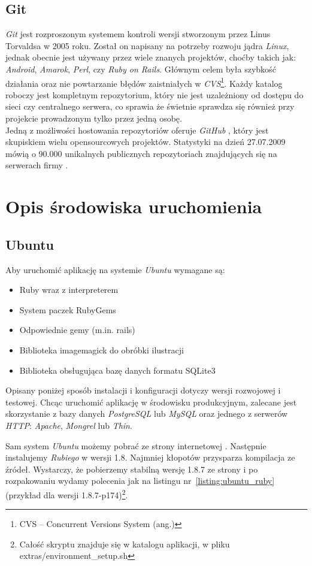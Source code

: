\documentclass[12pt,twoside]{report}
\begin{document}
\section{Git}
\emph{Git} jest rozproszonym systemem kontroli wersji stworzonym przez Linus Torvaldsa w 2005 roku.
Został on napisany na potrzeby rozwoju jądra \emph{Linux}, jednak obecnie jest używany
przez wiele znanych projektów, choćby takich jak: \emph{Android}, \emph{Amarok}, \emph{Perl},
czy \emph{Ruby on Rails}. Głównym celem była szybkość działania oraz nie powtarzanie błędów
zaistniałych w \emph{CVS}\footnote{CVS -- Concurrent Versions System (ang.)}.
Każdy katalog roboczy jest kompletnym repozytorium, który nie jest uzależniony od dostępu
do sieci czy centralnego serwera, co sprawia że świetnie sprawdza się również przy projekcie
prowadzonym tylko przez jedną osobę.\\
Jedną z możliwości hostowania repozytoriów oferuje \emph{GitHub} \cite{github}, który jest
skupiskiem wielu opensourcowych projektów. Statystyki na dzień 27.07.2009 mówią o 90.000
unikalnych publicznych repozytoriach znajdujących się na serwerach firmy \cite{github-statistics}.


\cleardoublepage
\chapter{Opis środowiska uruchomienia}
\section{Ubuntu}
Aby uruchomić aplikację na systemie \emph{Ubuntu} wymagane są:
\begin{itemize}
  \item{Ruby wraz z interpreterem}
  \item{System paczek RubyGems}
  \item{Odpowiednie gemy (m.in. rails)}
  \item{Biblioteka imagemagick do obróbki ilustracji}
  \item{Biblioteka obsługująca bazę danych formatu SQLite3}
\end{itemize}


Opisany poniżej sposób instalacji i konfiguracji dotyczy wersji rozwojowej i testowej.
Chcąc uruchomić aplikację w środowisku produkcyjnym, zalecane jest skorzystanie z bazy
danych \emph{PostgreSQL} lub \emph{MySQL} oraz jednego z serwerów \emph{HTTP}:
\emph{Apache}, \emph{Mongrel} lub \emph{Thin}.


Sam system \emph{Ubuntu} możemy pobrać ze strony internetowej \cite{ubuntu}.
Następnie instalujemy \emph{Rubiego} w wersji 1.8. Najmniej kłopotów przysparza kompilacja ze
źródeł. Wystarczy, że pobierzemy stabilną wersję 1.8.7 ze strony \cite{ruby-package} i po
rozpakowaniu wydamy polecenia jak na listingu nr~\ref{listing:ubuntu_ruby} (przykład dla
wersji 1.8.7-p174)\footnote{Całość skryptu znajduje się w katalogu aplikacji, w pliku
extras/environment\_setup.sh}.
\end{document}
